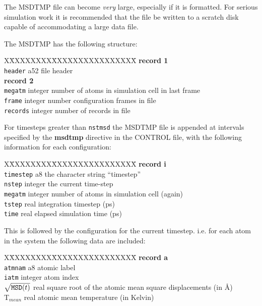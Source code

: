 The MSDTMP file can become {\em very} large, especially if it is
formatted.  For serious simulation work it is recommended that the
file be written to a scratch disk capable of accommodating a large
data file.

The MSDTMP has the following structure:
\begin{tabbing}
X\=XXXXXXXX\=XXXXXXXXXXXXXXXX\=\kill
{\bf record 1} \\
\> {\tt header}  \> a52     \> file header \\
{\bf record 2} \\
\> {\tt megatm}  \> integer \> number of atoms in simulation cell in last frame \\
\> {\tt frame}   \> integer \> number configuration frames in file \\
\> {\tt records} \> integer \> number of records in file
\end{tabbing}

For timesteps greater than {\tt nstmsd} the MSDTMP file is
appended at intervals specified by the {\bf msdtmp} directive in the
CONTROL file, with the following information for each
configuration:
\begin{tabbing}
X\=XXXXXXXX\=XXXXXXXXXXXXXXXX\=\kill
{\bf record i} \\
\> {\tt timestep} \> a8      \> the character string ``timestep'' \\
\> {\tt nstep}    \> integer \> the current time-step \\
\> {\tt megatm}   \> integer \> number of atoms in simulation cell (again) \\
\> {\tt tstep}    \> real    \> integration timestep (ps) \\
\> {\tt time}     \> real    \> elapsed simulation time (ps)
\end{tabbing}
This is followed by the configuration for the current timestep. i.e.
for each atom in the system the following data are included:
\begin{tabbing}
X\=XXXXXXXX\=XXXXXXXXXXXXXXXX\=\kill
{\bf record a} \\
\> {\tt atmnam}           \> a8      \> atomic label \\
\> {\tt iatm}             \> integer \> atom index \\
\> $\sqrt{{\tt MSD}(t)}$  \> real    \> square root of the atomic mean square displacements (in \AA) \\
\> T$_{mean}$             \> real    \> atomic mean temperature (in Kelvin)
\end{tabbing}

